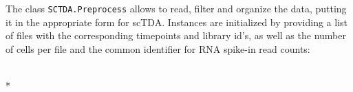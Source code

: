 \documentclass[letterpaper,10pt,english]{/usr/share/sphinx/texinputs/sphinxhowto}
\def\smaller{\fontsize{9.5pt}{9.5pt}\selectfont}
\begin{document}
The class \texttt{SCTDA.Preprocess} allows to read, filter and organize the
data, putting it in the appropriate form for scTDA. Instances are
initialized by providing a list of files with the corresponding
timepoints and library id's, as well as the number of cells per file and
the common identifier for RNA spike-in read counts:


    
        \vspace{8pt}
        \makebox[0.1\linewidth]{\smaller\hfill\tt\color{nbframe-in-prompt}In\hspace{4pt}{[}2{]}:\hspace{4pt}}\\*
        \vspace{-2.1\baselineskip}
\end{document}
